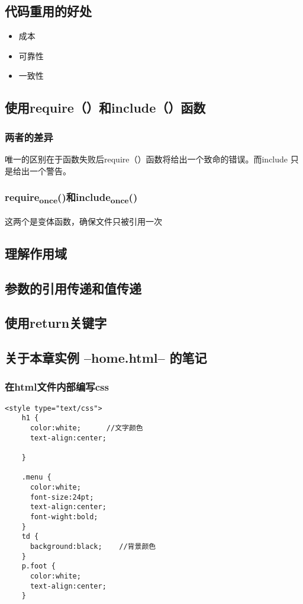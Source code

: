 \documentclass[11pt]{article}
\begin{document}
\subsection{代码重用的好处}
\label{sec:org329e773}
\begin{itemize}
\item 成本
\item 可靠性
\item 一致性
\end{itemize}
\subsection{使用require（）和include（）函数}
\label{sec:org18646e7}
\subsubsection{两者的差异}
\label{sec:orgaeb52d0}
唯一的区别在于函数失败后require（）函数将给出一个致命的错误。而include
只是给出一个警告。
\subsubsection{require\textsubscript{once}()和include\textsubscript{once}()}
\label{sec:org1e2f95b}
这两个是变体函数，确保文件只被引用一次
\subsection{理解作用域}
\label{sec:orgcbd2f21}
\subsection{参数的引用传递和值传递}
\label{sec:org9053458}
\subsection{使用return关键字}
\label{sec:org45e35a3}
\subsection{关于本章实例 --home.html-- 的笔记}
\label{sec:orga63cb0b}
\subsubsection{在html文件内部编写css}
\label{sec:org22f10f9}
\begin{verbatim}
<style type="text/css">
    h1 {
      color:white;      //文字颜色
      text-align:center;

    }

    .menu {
      color:white;
      font-size:24pt;
      text-align:center;
      font-wight:bold;
    }
    td {
      background:black;    //背景颜色
    }
    p.foot {
      color:white;
      text-align:center;
    }
\end{verbatim}
\end{document}
